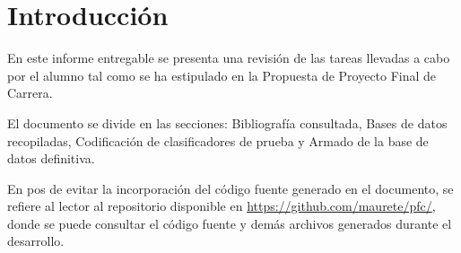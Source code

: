 \section{Introducción}
En este informe entregable se presenta una revisión de las tareas
llevadas a cabo por el alumno tal como se ha estipulado en la
Propuesta de Proyecto Final de Carrera.

El documento se divide en las secciones: Bibliografía consultada,
Bases de datos recopiladas, Codificación de clasificadores de prueba
y Armado de la base de datos definitiva.

En pos de evitar la incorporación del código fuente generado en el
documento, se refiere al lector al repositorio disponible en
\url{https://github.com/maurete/pfc/}, donde se puede consultar
el código fuente y demás archivos generados durante el desarrollo.